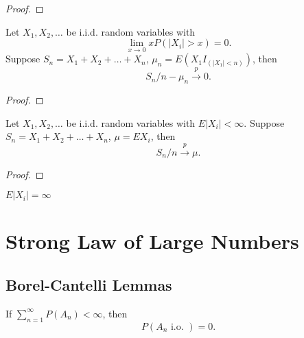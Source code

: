 \begin{proof}

\end{proof}

\begin{theorem}
	Let $X_1,X_2,\ldots$ be i.i.d. random variables with
	\begin{equation}
		\lim_{x\rightarrow 0}xP(|X_i|>x)=0.
	\end{equation}
	Suppose $S_n=X_1+X_2+\ldots+X_n$, $\mu_n=E\left(X_1I_{(|X_1|<n)}\right)$, then
	\begin{equation}
		S_n/n-\mu_n\stackrel{p}{\rightarrow}0.
	\end{equation}
\end{theorem}

\begin{proof}

\end{proof}

\begin{theorem} \label{thm:WLLN}
	Let $X_1,X_2,\ldots$ be i.i.d. random variables with $E|X_i|<\infty$. Suppose $S_n=X_1+X_2+\ldots+X_n$, $\mu=EX_i$, then
	\begin{equation}
		S_n/n\stackrel{p}{\rightarrow}\mu.
	\end{equation}
\end{theorem}

\begin{proof}

\end{proof}

\begin{remark}
	$E|X_i|=\infty$
\end{remark}

\section{Strong Law of Large Numbers}

\subsection{Borel-Cantelli Lemmas}

\begin{lemma} \label{lem:borel-cantelli-lemma}
	If $\sum_{n=1}^{\infty}P\left(A_{n}\right)<\infty$, then
	\begin{equation}
		P\left(A_{n}\text{ i.o. }\right)=0.
	\end{equation}
\end{lemma}

